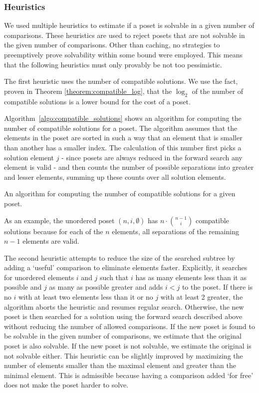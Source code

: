 \documentclass[10pt,journal,compsoc]{IEEEtran}
\begin{document}
\subsubsection{Heuristics}

We used multiple heuristics to estimate if a poset is solvable in a given number of comparisons.
These heuristics are used to reject posets that are not solvable in the given number of comparisons.
Other than caching, no strategies to preemptively prove solvability within some bound were employed.
This means that the following heuristics must only provably be not too pessimistic.

The first heuristic uses the number of compatible solutions.
We use the fact, proven in Theorem \ref{theorem:compatible_log}, that the $\log_2$ of the number of compatible solutions is a lower bound for the cost of a poset.

Algorithm~\ref{algo:compatible_solutions} shows an algorithm for computing the number of compatible solutions for a poset.
The algorithm assumes that the elements in the poset are sorted in such a way that an element that is smaller than another has a smaller index.
The calculation of this number first picks a solution element $j$ - since posets are always reduced in the forward search any element is valid - and then counts the number of possible separations into greater and lesser elements, summing up these counts over all solution elements.

\begin{algorithm}[t]
  \centering
  
  \caption{An algorithm for computing the number of compatible solutions for a given poset.}
  \label{algo:compatible_solutions}
\end{algorithm}

As an example, the unordered poset $(n,i,\emptyset)$ has $n \cdot \binom{n - 1}{i}$ compatible solutions because
for each of the $n$ elements, all separations of the remaining $n - 1$ elements
are valid.


The second heuristic attempts to reduce the size of the searched subtree by adding a `useful' comparison to eliminate elements faster.
Explicitly, it searches for unordered elements $i$ and $j$ such that $i$ has as many elements less than it as possible and $j$ as many as possible greater and adds $i < j$ to the poset.
If there is no $i$ with at least two elements less than it or no $j$ with at least 2 greater, the algorithm aborts the heuristic and resumes regular search.
Otherwise, the new poset is then searched for a solution using the forward search described above without reducing the number of allowed comparisons.
If the new poset is found to be solvable in the given number of comparisons, we estimate that the original poset is also solvable.
If the new poset is not solvable, we estimate the original is not solvable either.
This heuristic can be slightly improved by maximizing the number of elements smaller than the maximal element and greater than the minimal element.
This is admissible because having a comparison added `for free' does not make the poset harder to solve.
\end{document}
